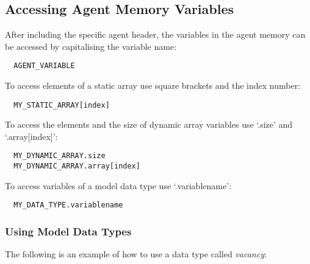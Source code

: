 \subsection{Accessing Agent Memory Variables}

After including the specific agent header, the variables in the
agent memory can be accessed by capitalising the variable name:

\begin{verbatim}
  AGENT_VARIABLE
\end{verbatim}

To access elements of a static array use square brackets and the index number:

\begin{verbatim}
  MY_STATIC_ARRAY[index]
\end{verbatim}

To access the elements and the size of dynamic array variables use
`.size' and `.array[index]':

\begin{verbatim}
  MY_DYNAMIC_ARRAY.size
  MY_DYNAMIC_ARRAY.array[index]
\end{verbatim}

To access variables of a model data type use `.variablename':

\begin{verbatim}
  MY_DATA_TYPE.variablename
\end{verbatim}

\subsubsection{Using Model Data Types}

The following is an example of how to use a data type called
\emph{vacancy}:


